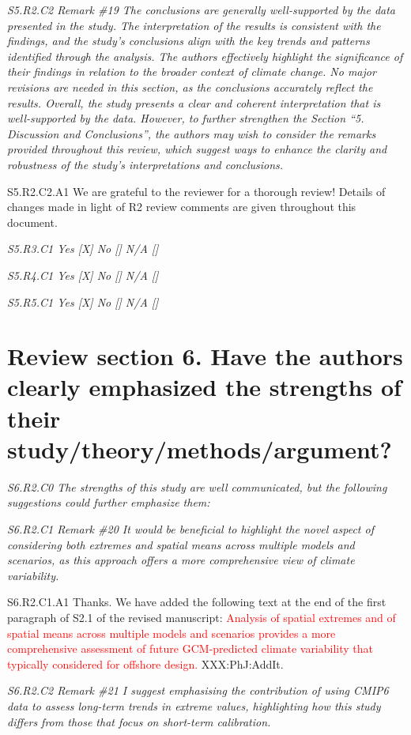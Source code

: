\documentclass[a4paper,10pt]{article}
\newcommand{\ed}[1]{\textcolor{red}{#1}}
\begin{document}
	\emph{S5.R2.C2 Remark \#19 The conclusions are generally well-supported by the data presented in the study. The interpretation of the results is consistent with the findings, and the study’s conclusions align with the key trends and patterns identified through the analysis. The authors effectively highlight the significance of their findings in relation to the broader context of climate change. No major revisions are needed in this section, as the conclusions accurately reflect the results. Overall, the study presents a clear and coherent interpretation that is well-supported by the data. However, to further strengthen the Section “5. Discussion and Conclusions”, the authors may wish to consider the remarks provided throughout this review, which suggest ways to enhance the clarity and robustness of the study’s interpretations and conclusions.}

	S5.R2.C2.A1 We are grateful to the reviewer for a thorough review! Details of changes made in light of R2 review comments are given throughout this document.

	\emph{S5.R3.C1 Yes [X] No [] N/A []}

	\emph{S5.R4.C1 Yes [X] No [] N/A []}

	\emph{S5.R5.C1 Yes [X] No [] N/A []}

	\section*{Review section 6. Have the authors clearly emphasized the strengths of their study/theory/methods/argument?}

	\emph{S6.R2.C0 The strengths of this study are well communicated, but the following suggestions could further emphasize them:}

	\emph{S6.R2.C1 Remark \#20 It would be beneficial to highlight the novel aspect of considering both extremes and spatial means across multiple models and scenarios, as this approach offers a more comprehensive view of climate variability.}

	S6.R2.C1.A1 Thanks. We have added the following text at the end of the first paragraph of S2.1 of the revised manuscript: \ed{Analysis of spatial extremes and of spatial means across multiple models and scenarios provides a more comprehensive assessment of future GCM-predicted climate variability that typically considered for offshore design.} XXX:PhJ:AddIt.

	\emph{S6.R2.C2 Remark \#21 I suggest emphasising the contribution of using CMIP6 data to assess long-term trends in extreme values, highlighting how this study differs from those that focus on short-term calibration.}
\end{document}

